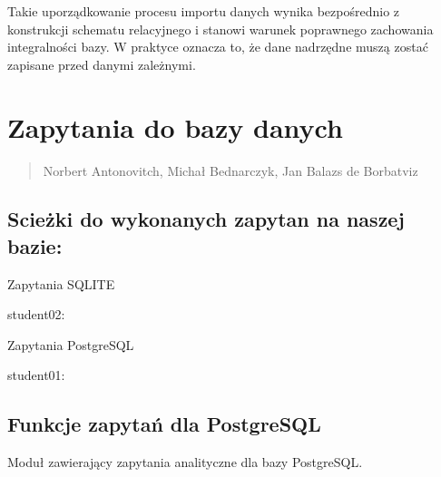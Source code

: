 \documentclass[a4paper,11pt,english,openany,oneside]{sphinxmanual}
\begin{document}
\sphinxAtStartPar
Takie uporządkowanie procesu importu danych wynika bezpośrednio z konstrukcji schematu relacyjnego i stanowi warunek poprawnego zachowania integralności bazy. W praktyce oznacza to, że dane nadrzędne muszą zostać zapisane przed danymi zależnymi.

\sphinxstepscope


\chapter{Zapytania do bazy danych}
\label{\detokenize{rozdzial_5/index:zapytania-do-bazy-danych}}\label{\detokenize{rozdzial_5/index::doc}}\begin{quote}\begin{description}
\sphinxAtStartPar
Norbert Antonovitch, Michał Bednarczyk, Jan Balazs de Borbatviz

\end{description}\end{quote}


\section{Scieżki do wykonanych zapytan na naszej bazie:}
\label{\detokenize{rozdzial_5/index:sciezki-do-wykonanych-zapytan-na-naszej-bazie}}
\sphinxAtStartPar
Zapytania SQLITE

\sphinxAtStartPar
student02: 

\sphinxAtStartPar
Zapytania PostgreSQL

\sphinxAtStartPar
student01:


\section{Funkcje zapytań dla PostgreSQL}
\label{\detokenize{rozdzial_5/index:module-zapytania_postgresql}}\label{\detokenize{rozdzial_5/index:funkcje-zapytan-dla-postgresql}}
\sphinxAtStartPar
Moduł zawierający zapytania analityczne dla bazy PostgreSQL.
\end{document}
